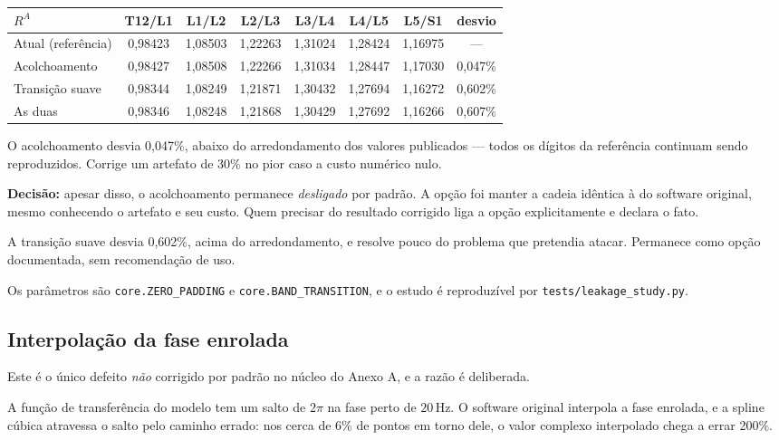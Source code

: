 \documentclass[11pt,a4paper]{article}
\newcommand{\code}[1]{\texttt{\small #1}}
\newcommand{\unit}[2]{\ensuremath{#1\,\mathrm{#2}}}
\begin{document}
\begin{center}
\begin{tabular}{lcccccc|c}
\toprule
$R^A$ & T12/L1 & L1/L2 & L2/L3 & L3/L4 & L4/L5 & L5/S1 & desvio \\
\midrule
Atual (referência) & 0,98423 & 1,08503 & 1,22263 & 1,31024 & 1,28424 & 1,16975 & --- \\
Acolchoamento      & 0,98427 & 1,08508 & 1,22266 & 1,31034 & 1,28447 & 1,17030 & 0,047\% \\
Transição suave    & 0,98344 & 1,08249 & 1,21871 & 1,30432 & 1,27694 & 1,16272 & 0,602\% \\
As duas            & 0,98346 & 1,08248 & 1,21868 & 1,30429 & 1,27692 & 1,16266 & 0,607\% \\
\bottomrule
\end{tabular}
\end{center}

O acolchoamento desvia 0,047\%, abaixo do arredondamento dos valores publicados
--- todos os dígitos da referência continuam sendo reproduzidos. Corrige um
artefato de 30\% no pior caso a custo numérico nulo.

\textbf{Decisão:} apesar disso, o acolchoamento permanece \emph{desligado} por
padrão. A opção foi manter a cadeia idêntica à do software original, mesmo
conhecendo o artefato e seu custo. Quem precisar do resultado corrigido liga a
opção explicitamente e declara o fato.

A transição suave desvia 0,602\%, acima do arredondamento, e resolve pouco do
problema que pretendia atacar. Permanece como opção documentada, sem
recomendação de uso.

Os parâmetros são \code{core.ZERO\_PADDING} e \code{core.BAND\_TRANSITION}, e o
estudo é reproduzível por \code{tests/leakage\_study.py}.

\subsection{Interpolação da fase enrolada}
\label{sec:fasebug}

Este é o único defeito \emph{não} corrigido por padrão no núcleo do Anexo A, e a
razão é deliberada.

A função de transferência do modelo tem um salto de $2\pi$ na fase perto de
\unit{20}{Hz}. O software original interpola a fase enrolada, e a spline cúbica
atravessa o salto pelo caminho errado: nos cerca de 6\% de pontos em torno dele,
o valor complexo interpolado chega a errar 200\%.
\end{document}
